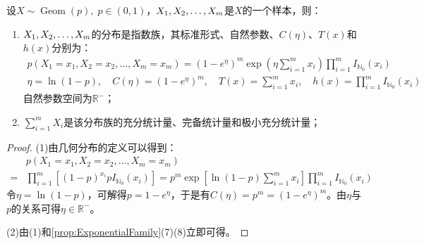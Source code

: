 \begin{theorem}
	设$X\sim\operatorname{Geom}(p),\;p\in(0,1)$，$X_1, X_2, \dots, X_{m}$是$X$的一个样本，则：
	\begin{enumerate}
		\item $X_1, X_2, \dots, X_{m}$的分布是指数族，其标准形式、自然参数、$C(\eta)$、$T(x)$和$h(x)$分别为：
		\begin{gather*}
			p(X_1=x_1,X_2=x_2,\dots,X_m=x_m)=(1-e^{\eta})^m\exp\left(\eta\sum_{i=1}^{m}x_i\right)\prod_{i=1}^{m}I_{\mathbb{N}_0}(x_i) \\
			\eta=\ln(1-p),\quad C(\eta)=(1-e^{\eta})^m,\quad T(x)=\sum_{i=1}^{m}x_i,\quad h(x)=\prod_{i=1}^{m}I_{\mathbb{N}_0}(x_i)
		\end{gather*}
		自然参数空间为$\mathbb{R}^{-}$；
		\item $\sum\limits_{i=1}^{m}X_i$是该分布族的充分统计量、完备统计量和极小充分统计量；
	\end{enumerate}
\end{theorem}
\begin{proof}
	(1)由几何分布的定义可以得到：
	\begin{align*}
		&p(X_1=x_1,X_2=x_2,\dots,X_m=x_m) \\
		=&\prod_{i=1}^{m}[(1-p)^{x_i}pI_{\mathbb{N}_0}(x_i)] =p^m\exp\left[\ln(1-p)\sum_{i=1}^{m}x_i\right]\prod_{i=1}^{m}I_{\mathbb{N}_0}(x_i)
	\end{align*}
	令$\eta=\ln(1-p)$，可解得$p=1-e^{\eta}$，于是有$C(\eta)=p^m=(1-e^{\eta})^m$。由$\eta$与$p$的关系可得$\eta\in\mathbb{R}^{-}$。\par
	(2)由(1)和\cref{prop:ExponentialFamily}(7)(8)立即可得。
\end{proof}

